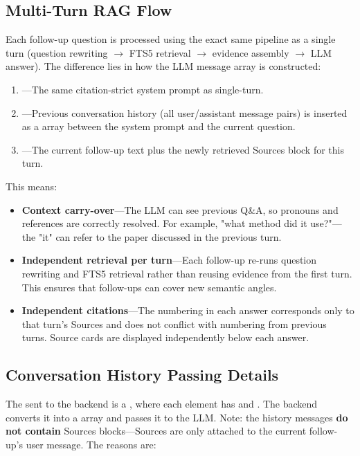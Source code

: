 \subsection{Multi-Turn RAG Flow}

Each follow-up question is processed using the exact same pipeline as a single turn (question
rewriting $\to$ FTS5 retrieval $\to$ evidence assembly $\to$ LLM answer). The difference lies in
how the LLM message array is constructed:

\begin{enumerate}
  \item {}---The same citation-strict system prompt as single-turn.
  \item {}---Previous conversation history (all user/assistant message pairs)
    is inserted as a  array between the system prompt and the current question.
  \item {}---The current follow-up text plus the newly retrieved
    Sources block for this turn.
\end{enumerate}

This means:

\begin{itemize}
  \item \textbf{Context carry-over}---The LLM can see previous Q\&A, so pronouns and references
    are correctly resolved. For example, "what method did it use?"---the "it" can refer to the
    paper discussed in the previous turn.
  \item \textbf{Independent retrieval per turn}---Each follow-up re-runs question rewriting and
    FTS5 retrieval rather than reusing evidence from the first turn. This ensures that follow-ups
    can cover new semantic angles.
  \item \textbf{Independent citations}---The \cmd{[N]} numbering in each answer corresponds only
    to that turn's Sources and does not conflict with numbering from previous turns. Source cards
    are displayed independently below each answer.
\end{itemize}

\subsection{Conversation History Passing Details}

The  sent to the backend is a , where
each element has  and . The backend converts it into a 
array and passes it to the LLM. Note: the history messages \textbf{do not contain} Sources
blocks---Sources are only attached to the current follow-up's user message. The reasons are:

